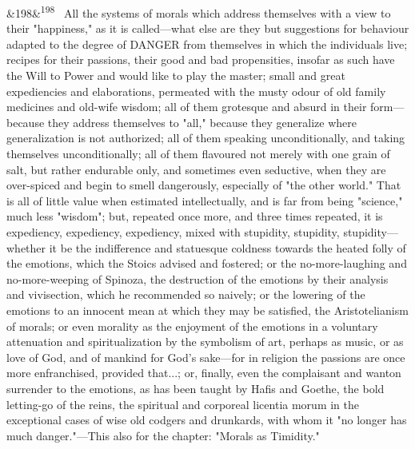 \documentclass[12pt]{article}
\newcommand{\para}[1][]{\par\noindent\ifx&#1&\else\textsuperscript{\footnotesize #1}~\fi}
\begin{document}
\para[198] All the systems of morals which address themselves with a view to their "happiness," as it is called---what else are they but suggestions for behaviour adapted to the degree of DANGER from themselves in which the individuals live; recipes for their passions, their good and bad propensities, insofar as such have the Will to Power and would like to play the master; small and great expediencies and elaborations, permeated with the musty odour of old family medicines and old-wife wisdom; all of them grotesque and absurd in their form---because they address themselves to "all," because they generalize where generalization is not authorized; all of them speaking unconditionally, and taking themselves unconditionally; all of them flavoured not merely with one grain of salt, but rather endurable only, and sometimes even seductive, when they are over-spiced and begin to smell dangerously, especially of "the other world." That is all of little value when estimated intellectually, and is far from being "science," much less "wisdom"; but, repeated once more, and three times repeated, it is expediency, expediency, expediency, mixed with stupidity, stupidity, stupidity---whether it be the indifference and statuesque coldness towards the heated folly of the emotions, which the Stoics advised and fostered; or the no-more-laughing and no-more-weeping of Spinoza, the destruction of the emotions by their analysis and vivisection, which he recommended so naively; or the lowering of the emotions to an innocent mean at which they may be satisfied, the Aristotelianism of morals; or even morality as the enjoyment of the emotions in a voluntary attenuation and spiritualization by the symbolism of art, perhaps as music, or as love of God, and of mankind for God's sake---for in religion the passions are once more enfranchised, provided that...; or, finally, even the complaisant and wanton surrender to the emotions, as has been taught by Hafis and Goethe, the bold letting-go of the reins, the spiritual and corporeal licentia morum in the exceptional cases of wise old codgers and drunkards, with whom it "no longer has much danger."---This also for the chapter: "Morals as Timidity."
\end{document}
